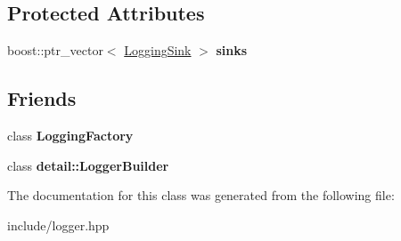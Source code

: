 \subsection*{Protected Attributes}
\begin{DoxyCompactItemize}
\item 
\hypertarget{classcore_1_1_logger_a75d632ed9c70304717a556487a6b7bb9}{boost\-::ptr\-\_\-vector$<$ \hyperlink{classcore_1_1_logging_sink}{Logging\-Sink} $>$ {\bfseries sinks}}\label{classcore_1_1_logger_a75d632ed9c70304717a556487a6b7bb9}

\end{DoxyCompactItemize}
\subsection*{Friends}
\begin{DoxyCompactItemize}
\item 
\hypertarget{classcore_1_1_logger_a773e30df3f9b689ef19d98ff845d9740}{class {\bfseries Logging\-Factory}}\label{classcore_1_1_logger_a773e30df3f9b689ef19d98ff845d9740}

\item 
\hypertarget{classcore_1_1_logger_a8f2300ec25af6a3f81eba842707466a2}{class {\bfseries detail\-::\-Logger\-Builder}}\label{classcore_1_1_logger_a8f2300ec25af6a3f81eba842707466a2}

\end{DoxyCompactItemize}


The documentation for this class was generated from the following file\-:\begin{DoxyCompactItemize}
\item 
include/logger.\-hpp\end{DoxyCompactItemize}
